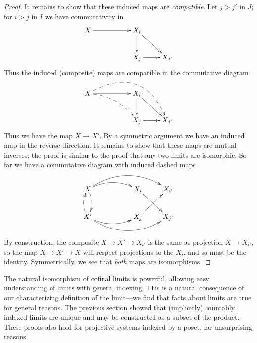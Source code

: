 \begin{proof}
        It remains to show that these induced maps are \emph{compatible}.
        Let $j>j'$ in $J$; for $i>j$ in $I$ we have commutativity in
        \begin{displaymath}
          \xymatrix{
            X \ar[rr] && X_i \ar[d] \ar[dr] \\
            && X_j \ar[r] & X_{j'}
          }
        \end{displaymath}
        Thus the induced (composite) maps are compatible in the commutative diagram
        \begin{displaymath}
          \xymatrix{
            X \ar[rr] \ar@/^35pt/@{-->}[drrr]^{} \ar@/^10pt/@{-->}[drr] && X_i \ar[d] \ar[dr] \\
            && X_j \ar[r] & X_{j'}
          }
        \end{displaymath}
        Thus we have the map $X\rightarrow X'$.
        By a symmetric argument we have an induced map in the reverse direction.
        It remains to show that these maps are mutual inverses; the proof is similar to the proof that any two limits are isomorphic.
        So far we have a commutative diagram with induced dashed maps
        \begin{displaymath}
          \xymatrix{
            X \ar@/^/@{-->}[d] \ar@/^10pt/[rr] \ar@/^20pt/[rrr]^{}
            && X_i \ar[dr] & X_{i'} \\
            X' \ar@/^/@{-->}[u] \ar@/_10pt/[rr] \ar@/_20pt/[rrr]_{}
            && X_j \ar[ur] & X_{j'}
          }
        \end{displaymath}
        By construction, the composite $X\rightarrow X' \rightarrow X_{i'}$ is the same as projection $X\rightarrow X_{i'}$, so the map $X\rightarrow X' \rightarrow X$ will respect projections to the $X_i$, and so must be the identity.
        Symmetrically, we see that \emph{both} maps are isomorphisms.
      \end{proof}

      The natural isomorphism of cofinal limits is powerful, allowing easy understanding of limits with general indexing.
      This is a natural consequence of our characterizing definition of the limit---we find that facts about limits are true for general reasons.
      The previous section showed that (implicitly) countably indexed limits are unique and may be constructed as a subset of the product.
      These proofs also hold for projective systems indexed by a poset, for unsurprising reasons.


